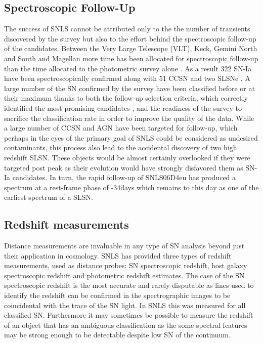 \subsection{Spectroscopic Follow-Up}
The success of SNLS cannot be attributed only to the the number of transients discovered by the survey but also to the effort behind the spectroscopic follow-up of the candidates. Between the Very Large Telescope (VLT), Keck, Gemini North and South and Magellan more time has been allocated for spectroscopic follow-up than the time allocated to the photometric survey alone \citep{Pritchet2004}. As a result 322 SN-Ia have been spectroscopically confirmed along with 51 CCSN and two SLSNe \citep{Guy2010,Howell2005,Howell2013}. A large number of the SN confirmed by the survey have been classified before or at their maximum thanks to both the follow-up selection criteria, which correctly identified the most promising candidates \citep{Sullivan2006}, and the readiness of the survey to sacrifice the classification rate in order to improve the quality of the data. While a large number of CCSN and AGN have been targeted for follow-up, which perhaps in the eyes of the primary goal of SNLS could be considered as undesired contaminants, this process also lead to the accidental discovery of two high redshift SLSN. These objects would be almost certainly overlooked if they were targeted post peak as their evolution would have strongly disfavored them as SN-Ia candidates. In turn, the rapid follow-up of SNLS06D4eu has produced a spectrum at a rest-frame phase of -34days which remains to this day as one of the earliest spectrum of a SLSN.        

\subsection{Redshift measurements}
Distance measurements are invaluable in any type of SN analysis beyond just their application in cosmology. SNLS has provided three types of redshift measurements, used as distance probes: SN spectroscopic redshift, host galaxy spectroscopic redshift and photometric redshift estimates. The case of the SN spectroscopic redshift is the most accurate and rarely disputable as lines used to identify the redshift can be confirmed in the spectrographic images to be coincidental with the trace of the SN light. In SNLS this was measured for all classified SN. Furthermore it may sometimes be possible to measure the redshift of an object that has an ambiguous classification as the some spectral features may be strong enough to be detectable despite low S\/N of the continuum.


